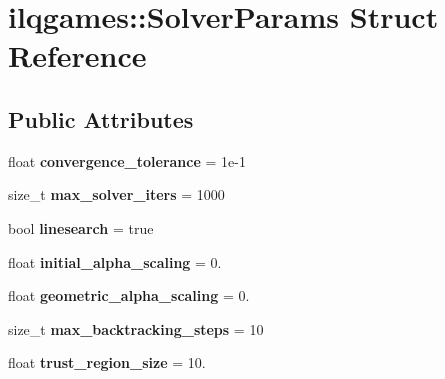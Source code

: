 \hypertarget{structilqgames_1_1_solver_params}{}\section{ilqgames\+:\+:Solver\+Params Struct Reference}
\label{structilqgames_1_1_solver_params}
\subsection*{Public Attributes}
\begin{DoxyCompactItemize}
\item 
float {\bfseries convergence\+\_\+tolerance} = 1e-\/1\hypertarget{structilqgames_1_1_solver_params_afe3985198f617a446e43e3d3a3c6ed2e}{}\label{structilqgames_1_1_solver_params_afe3985198f617a446e43e3d3a3c6ed2e}

\item 
size\+\_\+t {\bfseries max\+\_\+solver\+\_\+iters} = 1000\hypertarget{structilqgames_1_1_solver_params_a525076d6ad3f90a2fc5c410d88dc090f}{}\label{structilqgames_1_1_solver_params_a525076d6ad3f90a2fc5c410d88dc090f}

\item 
bool {\bfseries linesearch} = true\hypertarget{structilqgames_1_1_solver_params_af5c0bdc01591507e9a83f686a5be8e49}{}\label{structilqgames_1_1_solver_params_af5c0bdc01591507e9a83f686a5be8e49}

\item 
float {\bfseries initial\+\_\+alpha\+\_\+scaling} = 0.\hypertarget{structilqgames_1_1_solver_params_ac4b00024e1a74f611a0aeacbcdf91719}{}\label{structilqgames_1_1_solver_params_ac4b00024e1a74f611a0aeacbcdf91719}

\item 
float {\bfseries geometric\+\_\+alpha\+\_\+scaling} = 0.\hypertarget{structilqgames_1_1_solver_params_a36f6667fd24a5c763c6e03f67acbbcb8}{}\label{structilqgames_1_1_solver_params_a36f6667fd24a5c763c6e03f67acbbcb8}

\item 
size\+\_\+t {\bfseries max\+\_\+backtracking\+\_\+steps} = 10\hypertarget{structilqgames_1_1_solver_params_ad130123c76a7b90d41cf836e275dfef0}{}\label{structilqgames_1_1_solver_params_ad130123c76a7b90d41cf836e275dfef0}

\item 
float {\bfseries trust\+\_\+region\+\_\+size} = 10.\hypertarget{structilqgames_1_1_solver_params_af6f8750a857ace4ecb52e85fb7d04021}{}\label{structilqgames_1_1_solver_params_af6f8750a857ace4ecb52e85fb7d04021}


\end{DoxyCompactItemize}
